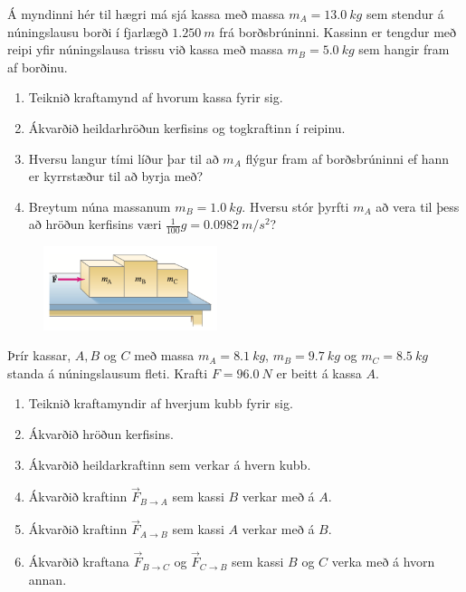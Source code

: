 \ifdefined \wholebook \else\documentclass[oneside]{book}\usepackage{EdlBook}\graphicspath{{figures/}}
\begin{document}
\begin{enumerate}[label = \textbf{Dæmi \thechapter.\arabic*.}]
\begin{minipage}{\linewidth}
\item Á myndinni hér til hægri má sjá kassa með massa $m_A = \SI{13.0}{kg}$ sem stendur á núningslausu borði í fjarlægð $\SI{1.250}{m}$ frá borðsbrúninni. Kassinn er tengdur með reipi yfir núningslausa trissu við kassa með massa $m_B = \SI{5.0}{kg}$ sem hangir fram af borðinu.
\begin{enumerate}[label = \textbf{(\alph*)}]
    \item Teiknið kraftamynd af hvorum kassa fyrir sig.
    \item Ákvarðið heildarhröðun kerfisins og togkraftinn í reipinu.
    \item Hversu langur tími líður þar til að $m_A$ flýgur fram af borðsbrúninni ef hann er kyrrstæður til að byrja með?
    \item Breytum núna massanum $m_B = \SI{1.0}{kg}$. Hversu stór þyrfti $m_A$ að vera til þess að hröðun kerfisins væri $\frac{1}{100}g = \SI{0.0982}{m/s^2}$?
\end{enumerate}

\end{minipage}

\begin{minipage}{\linewidth}
\begin{figure}
\includegraphics[width=2in]{images/3kubbar.png}
\end{figure}

\item Þrír kassar, $A,B$ og $C$ með massa $m_A = \SI{8.1}{kg}$, $m_B = \SI{9.7}{kg}$ og $m_C = \SI{8.5}{kg}$ standa á núningslausum fleti. Krafti $F = \SI{96.0}{N}$ er beitt á kassa $A$.
\begin{enumerate}[label = \textbf{(\alph*)}]
    \item Teiknið kraftamyndir af hverjum kubb fyrir sig.
    \item Ákvarðið hröðun kerfisins.
    \item Ákvarðið heildarkraftinn sem verkar á hvern kubb.
    \item Ákvarðið kraftinn $\vec{F}_{B \to A}$ sem kassi $B$ verkar með á $A$.
    \item Ákvarðið kraftinn $\vec{F}_{A \to B}$ sem kassi $A$ verkar með á $B$.
    \item Ákvarðið kraftana $\vec{F}_{B \to C}$ og $\vec{F}_{C \to B}$ sem kassi $B$ og $C$ verka með á hvorn annan.
\end{enumerate}


\end{minipage}
\end{enumerate}
\end{document}
